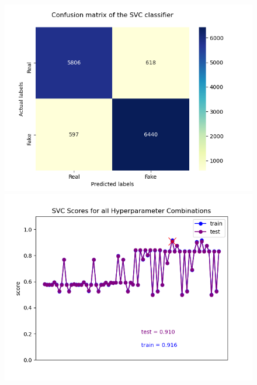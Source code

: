 \documentclass[10pt,twocolumn,letterpaper]{article}
\begin{document}
\begin{figure}[h]
   \begin{center}
        \includegraphics[width=\linewidth]{Latex_Report/report/Graphs/SVC/confusion_matrix.png}
        \includegraphics[width=\linewidth]{Latex_Report/report/Graphs/SVC/scores_plot.png}
   \end{center}
        \vspace*{-5mm}
        \caption{\label{fourth_figure}}
\end{figure}
\end{document}
